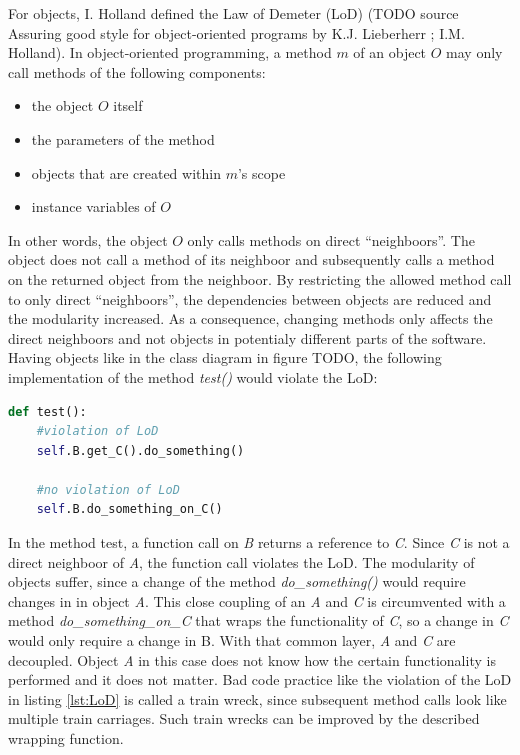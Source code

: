 For objects, I. Holland defined the Law of Demeter (LoD) (TODO source Assuring good style for object-oriented programs by K.J. Lieberherr ; I.M. Holland).
In object-oriented programming, a method $m$ of an object $O$ may only call methods of the following components:
\begin{itemize}
    \item the object $O$ itself
    \item the parameters of the method
    \item objects that are created within $m$'s scope
    \item instance variables of $O$
\end{itemize}
In other words, the object $O$ only calls methods on direct \enquote{neighboors}. The object does not call a method of its neighboor and subsequently calls a method on the returned object from the neighboor. By restricting the allowed method call to only direct \enquote{neighboors}, the dependencies between objects are reduced and the modularity increased. As a consequence, changing methods only affects the direct neighboors and not objects in potentialy different parts of the software. Having objects like in the class diagram in figure TODO, the following implementation of the method \textit{test()} would violate the LoD:
\begin{lstlisting}[language=Python, label=lst:LoD, caption={TODO caption}]
def test():
    #violation of LoD
    self.B.get_C().do_something()

    #no violation of LoD
    self.B.do_something_on_C()
\end{lstlisting}
In the method test, a function call on \textit{B} returns a reference to \textit{C}. Since \textit{C} is not a direct neighboor of \textit{A}, the function call violates the LoD. The modularity of objects suffer, since a change of the method \textit{do\_something()} would require changes in in object \textit{A}. This close coupling of an \textit{A} and \textit{C} is circumvented with a method \textit{do\_something\_on\_C} that wraps the functionality of \textit{C}, so a change in \textit{C} would only require a change in B. With that common layer, \textit{A} and \textit{C} are decoupled. Object \textit{A} in this case does not know how the certain functionality is performed and it does not matter.  
Bad code practice like the violation of the LoD in listing \ref{lst:LoD} is called a train wreck, since subsequent method calls look like multiple train carriages. Such train wrecks can be improved  by the described wrapping function.

